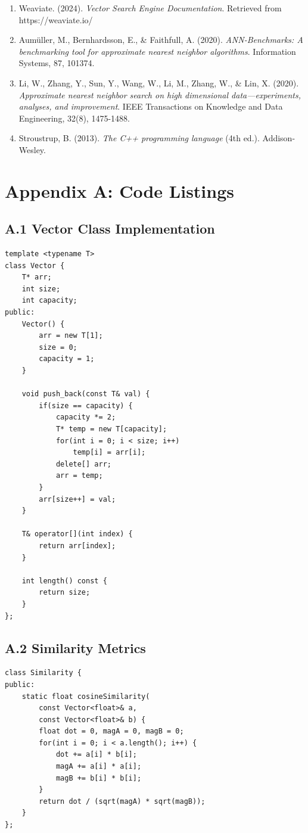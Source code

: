 \documentclass[12pt,a4paper]{article}
\begin{document}
\begin{enumerate}
    \item Weaviate. (2024). \textit{Vector Search Engine Documentation}. Retrieved from https://weaviate.io/
    
    \item Aumüller, M., Bernhardsson, E., \& Faithfull, A. (2020). \textit{ANN-Benchmarks: A benchmarking tool for approximate nearest neighbor algorithms}. Information Systems, 87, 101374.
    
    \item Li, W., Zhang, Y., Sun, Y., Wang, W., Li, M., Zhang, W., \& Lin, X. (2020). \textit{Approximate nearest neighbor search on high dimensional data—experiments, analyses, and improvement}. IEEE Transactions on Knowledge and Data Engineering, 32(8), 1475-1488.
    
    \item Stroustrup, B. (2013). \textit{The C++ programming language} (4th ed.). Addison-Wesley.
\end{enumerate}

\newpage

\section*{Appendix A: Code Listings}

\subsection*{A.1 Vector Class Implementation}
\begin{lstlisting}
template <typename T>
class Vector {
    T* arr;
    int size;
    int capacity;
public:
    Vector() {
        arr = new T[1];
        size = 0;
        capacity = 1;
    }
    
    void push_back(const T& val) {
        if(size == capacity) {
            capacity *= 2;
            T* temp = new T[capacity];
            for(int i = 0; i < size; i++)
                temp[i] = arr[i];
            delete[] arr;
            arr = temp;
        }
        arr[size++] = val;
    }
    
    T& operator[](int index) {
        return arr[index];
    }
    
    int length() const {
        return size;
    }
};
\end{lstlisting}

\subsection*{A.2 Similarity Metrics}
\begin{lstlisting}
class Similarity {
public:
    static float cosineSimilarity(
        const Vector<float>& a, 
        const Vector<float>& b) {
        float dot = 0, magA = 0, magB = 0;
        for(int i = 0; i < a.length(); i++) {
            dot += a[i] * b[i];
            magA += a[i] * a[i];
            magB += b[i] * b[i];
        }
        return dot / (sqrt(magA) * sqrt(magB));
    }
};
\end{lstlisting}
\end{document}
